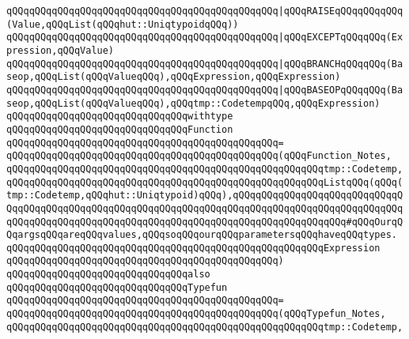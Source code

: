 \newline
\verb|qQQqqQQqqQQqqQQqqQQqqQQqqQQqqQQqqQQqqQQqqQQqqQQq|\verb#|qQQqRAISEqQQqqQQqqQQq(Value,qQQqList(qQQqhut::UniqtypoidqQQq))#\newline
\verb|qQQqqQQqqQQqqQQqqQQqqQQqqQQqqQQqqQQqqQQqqQQqqQQq|\verb#|qQQqEXCEPTqQQqqQQq(Expression,qQQqValue)#\newline
\newline
\verb|qQQqqQQqqQQqqQQqqQQqqQQqqQQqqQQqqQQqqQQqqQQqqQQq|\verb#|qQQqBRANCHqQQqqQQq(Baseop,qQQqList(qQQqValueqQQq),qQQqExpression,qQQqExpression)#\newline
\verb|qQQqqQQqqQQqqQQqqQQqqQQqqQQqqQQqqQQqqQQqqQQqqQQq|\verb#|qQQqBASEOPqQQqqQQq(Baseop,qQQqList(qQQqValueqQQq),qQQqtmp::CodetempqQQq,qQQqExpression)#\newline
\newline
\verb|qQQqqQQqqQQqqQQqqQQqqQQqqQQqqQQqwithtype|\newline
\verb|qQQqqQQqqQQqqQQqqQQqqQQqqQQqqQQqFunction|\newline
\verb|qQQqqQQqqQQqqQQqqQQqqQQqqQQqqQQqqQQqqQQqqQQqqQQq=|\newline
\verb|qQQqqQQqqQQqqQQqqQQqqQQqqQQqqQQqqQQqqQQqqQQqqQQq(qQQqFunction_Notes,|\newline
\verb|qQQqqQQqqQQqqQQqqQQqqQQqqQQqqQQqqQQqqQQqqQQqqQQqqQQqqQQqtmp::Codetemp,|\newline
\verb|qQQqqQQqqQQqqQQqqQQqqQQqqQQqqQQqqQQqqQQqqQQqqQQqqQQqqQQqListqQQq(qQQq(tmp::Codetemp,qQQqhut::Uniqtypoid)qQQq),qQQqqQQqqQQqqQQqqQQqqQQqqQQqqQQqqQQqqQQqqQQqqQQqqQQqqQQqqQQqqQQqqQQqqQQqqQQqqQQqqQQqqQQqqQQqqQQqqQQqqQQqqQQqqQQqqQQqqQQqqQQqqQQqqQQqqQQqqQQqqQQqqQQqqQQqqQQqqQQq#qQQqOurqQQqargsqQQqareqQQqvalues,qQQqsoqQQqourqQQqparametersqQQqhaveqQQqtypes.|\newline
\verb|qQQqqQQqqQQqqQQqqQQqqQQqqQQqqQQqqQQqqQQqqQQqqQQqqQQqqQQqExpression|\newline
\verb|qQQqqQQqqQQqqQQqqQQqqQQqqQQqqQQqqQQqqQQqqQQqqQQq)|\newline
\newline
\verb|qQQqqQQqqQQqqQQqqQQqqQQqqQQqqQQqalso|\newline
\verb|qQQqqQQqqQQqqQQqqQQqqQQqqQQqqQQqTypefun|\newline
\verb|qQQqqQQqqQQqqQQqqQQqqQQqqQQqqQQqqQQqqQQqqQQqqQQq=|\newline
\verb|qQQqqQQqqQQqqQQqqQQqqQQqqQQqqQQqqQQqqQQqqQQqqQQq(qQQqTypefun_Notes,|\newline
\verb|qQQqqQQqqQQqqQQqqQQqqQQqqQQqqQQqqQQqqQQqqQQqqQQqqQQqqQQqtmp::Codetemp,|\newline
